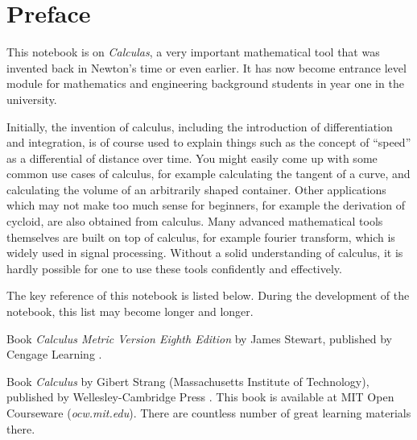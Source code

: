 \chapter*{Preface}

This notebook is on \textit{Calculas}, a very important mathematical tool that was invented back in Newton's time or even earlier. It has now become entrance level module for mathematics and engineering background students in year one in the university.

Initially, the invention of calculus, including the introduction of differentiation and integration, is of course used to explain things such as the concept of ``speed'' as a differential of distance over time. You might easily come up with some common use cases of calculus, for example calculating the tangent of a curve, and calculating the volume of an arbitrarily shaped container. Other applications which may not make too much sense for beginners, for example the derivation of cycloid, are also obtained from calculus. Many advanced mathematical tools themselves are built on top of calculus, for example fourier transform, which is widely used in signal processing. Without a solid understanding of calculus, it is hardly possible for one to use these tools confidently and effectively.

The key reference of this notebook is listed below. During the development of the notebook, this list may become longer and longer.

Book \textit{Calculus Metric Version Eighth Edition} by James Stewart, published by Cengage Learning \cite{stewart2015calculus}.

Book \textit{Calculus} by Gibert Strang (Massachusetts Institute of Technology), published by Wellesley-Cambridge Press \cite{strangt1991calculus}. This book is available at MIT Open Courseware (\textit{ocw.mit.edu}). There are countless number of great learning materials there.